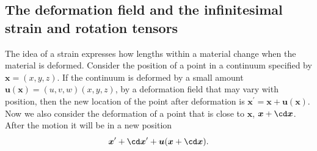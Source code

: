 \documentclass[twoside,11pt]		{report}
\begin{document}
\subsection{The deformation field and the infinitesimal strain and
  rotation tensors}

The idea of a strain expresses how lengths within a material change
when the material is deformed. Consider the position of a point in a
continuum specified by $\bm{x}=(x, y, z)$. If the continuum is
deformed by a small amount $\bm{u}(\bm{x})=(u, v, w)(x, y, z)$, \ie by
a deformation field that may vary with position, then the new location
of the point after deformation is
$\bm{x}^\prime=\bm{x}+\bm{u}(\bm{x})$. Now we also consider the
deformation of a point that is close to $\bm{x}$, \ie
$\bm{x}+\cd\bm{x}$. After the motion it will be in a new position
\[
\bm{x}^\prime + \cd\bm{x}^\prime + \bm{u}(\bm{x}+\cd\bm{x}).
\]
\end{document}
